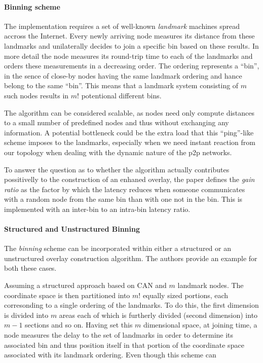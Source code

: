 \documentclass[a4paper,10pt]{article}
\begin{document}
\paragraph*{Binning scheme} The implementation requires a set of well-known \emph{landmark} machines spread accross the Internet. Every newly arriving node measures its distance from these landmarks and unilaterally decides to join a specific bin based on these results. In more detail the node measures its round-trip time to each of the landmarks and orders these measurements in a decreasing order. The ordering represents a ``bin'', in the sence of close-by nodes having the same landmark ordering and hance belong to the same ``bin''. This means that a landmark system consisting of $m$ such nodes results in $m!$ potentional different bins.

The algorithm can be considered scalable, as nodes need only compute distances to a small number of predefined nodes and thus without exchanging any information. A potential bottleneck could be the extra load that this ``ping''-like scheme imposes to the landmarks, especially when we need instant reaction from our topology when dealing with the dynamic nature of the p2p networks.

To answer the question as to whether the algorithm actually contributes possitivelly to the construction of an enhaned overlay, the paper defines the \emph{gain ratio} as the factor by which the latency reduces when someone communicates with a random node from the same bin than with one not in the bin. This is implemented with an inter-bin to an intra-bin latency ratio.

\paragraph*{Structured and Unstructured Binning} The \emph{binning} scheme can be incorporated within either a structured or an unstructured overlay construction algorithm. The authors provide an example for both these cases.

Assuming a structured approach based on CAN\cite{ratnasamy_can_2001} and $m$ landmark nodes. The coordinate space is then partitioned into $m!$ equally sized portions, each corresonding to a single ordering of the landmarks. To do this, the first dimension is divided into $m$ areas each of which is furtherly divided (second dimension) into $m - 1$ sections and so on. Having set this $m$ dimensional space, at joining time, a node measures the delay to the set of landmarks in order to determine its associated bin and thus position itself in that portion of the coordinate space associated with its landmark ordering. Even though this scheme can 
\end{document}

